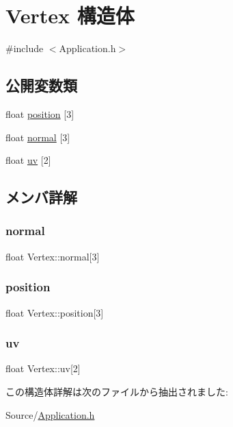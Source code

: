 \hypertarget{struct_vertex}{}\section{Vertex 構造体}
\label{struct_vertex}


{\ttfamily \#include $<$Application.\+h$>$}

\subsection*{公開変数類}
\begin{DoxyCompactItemize}
\item 
float \mbox{\hyperlink{struct_vertex_a1a5f22694da8ef6c906956eea8ddc924}{position}} \mbox{[}3\mbox{]}
\item 
float \mbox{\hyperlink{struct_vertex_a44dd0d22dccb4684ba4c8cb7400536fc}{normal}} \mbox{[}3\mbox{]}
\item 
float \mbox{\hyperlink{struct_vertex_aee487a9e1bb4ab5947ab81348374e189}{uv}} \mbox{[}2\mbox{]}
\end{DoxyCompactItemize}


\subsection{メンバ詳解}
\mbox{\label{struct_vertex_a44dd0d22dccb4684ba4c8cb7400536fc}} 
\subsubsection{\texorpdfstring{normal}{normal}}
{\footnotesize\ttfamily float Vertex\+::normal\mbox{[}3\mbox{]}}

\mbox{\label{struct_vertex_a1a5f22694da8ef6c906956eea8ddc924}} 
\subsubsection{\texorpdfstring{position}{position}}
{\footnotesize\ttfamily float Vertex\+::position\mbox{[}3\mbox{]}}

\mbox{\label{struct_vertex_aee487a9e1bb4ab5947ab81348374e189}} 
\subsubsection{\texorpdfstring{uv}{uv}}
{\footnotesize\ttfamily float Vertex\+::uv\mbox{[}2\mbox{]}}



この構造体詳解は次のファイルから抽出されました\+:\begin{DoxyCompactItemize}
\item 
Source/\mbox{\hyperlink{_application_8h}{Application.\+h}}\end{DoxyCompactItemize}
